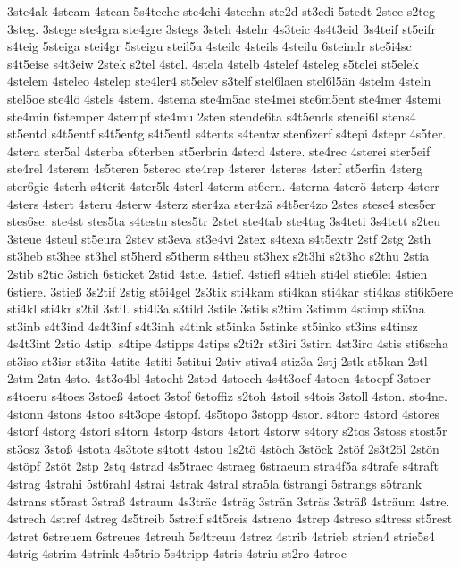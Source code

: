 {3ste4ak
4steam
4stean
5s4teche
ste4chi
4stechn
ste2d
st3edi
5stedt
2stee
s2teg
3steg.
3stege
ste4gra
ste4gre
3stegs
3steh
4stehr
4s3teic
4s4t3eid
3s4teif
st5eifr
s4teig
5steiga
stei4gr
5steigu
steil5a
4steilc
4steils
4steilu
6steindr
ste5i4sc
s4t5eise
s4t3eiw
2stek
s2tel
4stel.
4stela
4stelb
4stelef
4steleg
s5telei
st5elek
4stelem
4steleo
4stelep
ste4ler4
st5elev
s3telf
stel6laen
stel6l5än
4stelm
4steln
stel5oe
ste4lö
4stels
4stem.
4stema
ste4m5ac
ste4mei
ste6m5ent
ste4mer
4stemi
ste4min
6stemper
4stempf
ste4mu
2sten
stende6ta
s4t5ends
stenei6l
stens4
st5entd
s4t5entf
s4t5entg
s4t5entl
s4tents
s4tentw
sten6zerf
s4tepi
4stepr
4s5ter.
4stera
ster5al
4sterba
s6terben
st5erbrin
4sterd
4stere.
ste4rec
4sterei
ster5eif
ste4rel
4sterem
4s5teren
5stereo
ste4rep
4sterer
4steres
4sterf
st5erfin
4sterg
ster6gie
4sterh
s4terit
4ster5k
4sterl
4sterm
st6ern.
4sterna
4sterö
4sterp
4sterr
4sters
4stert
4steru
4sterw
4sterz
ster4za
ster4zä
s4t5er4zo
2stes
stese4
stes5er
stes6se.
ste4st
stes5ta
s4testn
stes5tr
2stet
ste4tab
ste4tag
3s4teti
3s4tett
s2teu
3steue
4steul
st5eura
2stev
st3eva
st3e4vi
2stex
s4texa
s4t5extr
2stf
2stg
2sth
st3heb
st3hee
st3hel
st5herd
s5therm
s4theu
st3hex
s2t3hi
s2t3ho
s2thu
2stia
2stib
s2tic
3stich
6sticket
2stid
4stie.
4stief.
4stiefl
s4tieh
sti4el
stie6lei
4stien
6stiere.
3stieß
3s2tif
2stig
st5i4gel
2s3tik
sti4kam
sti4kan
sti4kar
sti4kas
sti6k5ere
sti4kl
sti4kr
s2til
3stil.
sti4l3a
s3tild
3stile
3stils
s2tim
3stimm
4stimp
sti3na
st3inb
s4t3ind
4s4t3inf
s4t3inh
s4tink
st5inka
5stinke
st5inko
st3ins
s4tinsz
4s4t3int
2stio
4stip.
s4tipe
4stipps
4stips
s2ti2r
st3iri
3stirn
4st3iro
4stis
sti6scha
st3iso
st3isr
st3ita
4stite
4stiti
5stitui
2stiv
stiva4
stiz3a
2stj
2stk
st5kan
2stl
2stm
2stn
4sto.
4st3o4bl
4stocht
2stod
4stoech
4s4t3oef
4stoen
4stoepf
3stoer
s4toeru
s4toes
3stoeß
4stoet
3stof
6stoffiz
s2toh
4stoil
s4tois
3stoll
4ston.
sto4ne.
4stonn
4stons
4stoo
s4t3ope
4stopf.
4s5topo
3stopp
4stor.
s4torc
4stord
4stores
4storf
4storg
4stori
s4torn
4storp
4stors
4stort
4storw
s4tory
s2tos
3stoss
stost5r
st3osz
3stoß
4stota
4s3tote
s4tott
4stou
1s2tö
4stöch
3stöck
2stöf
2s3t2öl
2stön
4stöpf
2stöt
2stp
2stq
4strad
4s5traec
4straeg
6straeum
stra4f5a
s4trafe
s4traft
4strag
4strahi
5st6rahl
4strai
4strak
4stral
stra5la
6strangi
5strangs
s5trank
4strans
st5rast
3straß
4straum
4s3träc
4sträg
3strän
3sträs
3sträß
4sträum
4stre.
4strech
4stref
4streg
4s5treib
5streif
s4t5reis
4streno
4strep
4streso
s4tress
st5rest
4stret
6streuem
6streues
4streuh
5s4treuu
4strez
4strib
4strieb
strien4
strie5s4
4strig
4strim
4strink
4s5trio
5s4tripp
4stris
4striu
st2ro
4stroc
}
